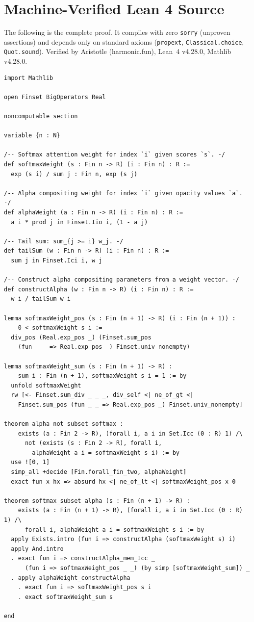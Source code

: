 \documentclass[twoside,11pt]{article}
\begin{document}
\appendix

\section{Machine-Verified Lean 4 Source}
\label{app:lean}

The following is the complete proof. It compiles with zero \texttt{sorry} (unproven assertions) and depends only on standard axioms (\texttt{propext}, \texttt{Classical.choice}, \texttt{Quot.sound}). Verified by Aristotle (harmonic.fun), Lean~4 v4.28.0, Mathlib v4.28.0.

\begin{lstlisting}
import Mathlib

open Finset BigOperators Real

noncomputable section

variable {n : N}

/-- Softmax attention weight for index `i` given scores `s`. -/
def softmaxWeight (s : Fin n -> R) (i : Fin n) : R :=
  exp (s i) / sum j : Fin n, exp (s j)

/-- Alpha compositing weight for index `i` given opacity values `a`. -/
def alphaWeight (a : Fin n -> R) (i : Fin n) : R :=
  a i * prod j in Finset.Iio i, (1 - a j)

/-- Tail sum: sum_{j >= i} w_j. -/
def tailSum (w : Fin n -> R) (i : Fin n) : R :=
  sum j in Finset.Ici i, w j

/-- Construct alpha compositing parameters from a weight vector. -/
def constructAlpha (w : Fin n -> R) (i : Fin n) : R :=
  w i / tailSum w i

lemma softmaxWeight_pos (s : Fin (n + 1) -> R) (i : Fin (n + 1)) :
    0 < softmaxWeight s i :=
  div_pos (Real.exp_pos _) (Finset.sum_pos
    (fun _ _ => Real.exp_pos _) Finset.univ_nonempty)

lemma softmaxWeight_sum (s : Fin (n + 1) -> R) :
    sum i : Fin (n + 1), softmaxWeight s i = 1 := by
  unfold softmaxWeight
  rw [<- Finset.sum_div _ _ _, div_self <| ne_of_gt <|
    Finset.sum_pos (fun _ _ => Real.exp_pos _) Finset.univ_nonempty]

theorem alpha_not_subset_softmax :
    exists (a : Fin 2 -> R), (forall i, a i in Set.Icc (0 : R) 1) /\
      not (exists (s : Fin 2 -> R), forall i,
        alphaWeight a i = softmaxWeight s i) := by
  use ![0, 1]
  simp_all +decide [Fin.forall_fin_two, alphaWeight]
  exact fun x hx => absurd hx <| ne_of_lt <| softmaxWeight_pos x 0

theorem softmax_subset_alpha (s : Fin (n + 1) -> R) :
    exists (a : Fin (n + 1) -> R), (forall i, a i in Set.Icc (0 : R) 1) /\
      forall i, alphaWeight a i = softmaxWeight s i := by
  apply Exists.intro (fun i => constructAlpha (softmaxWeight s) i)
  apply And.intro
  . exact fun i => constructAlpha_mem_Icc _
      (fun i => softmaxWeight_pos _ _) (by simp [softmaxWeight_sum]) _
  . apply alphaWeight_constructAlpha
    . exact fun i => softmaxWeight_pos s i
    . exact softmaxWeight_sum s

end
\end{lstlisting}
\end{document}
